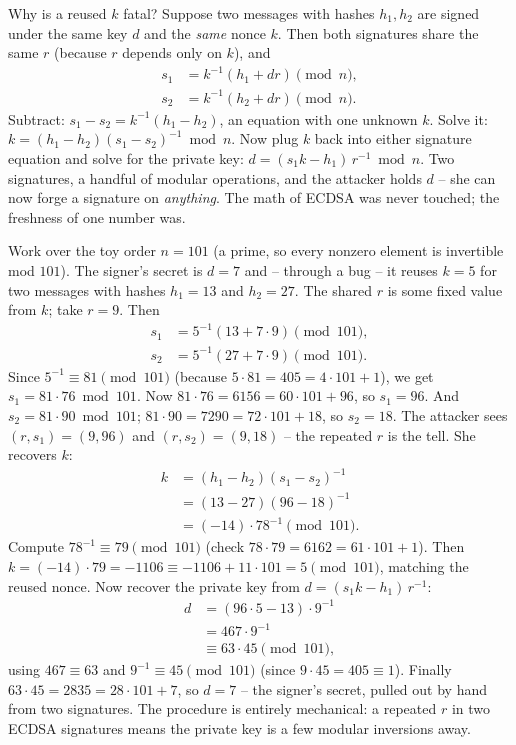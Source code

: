 \begin{whybox}
Why is a reused $k$ fatal? Suppose two messages with hashes $h_1, h_2$ are signed under the same key $d$ and the \emph{same} nonce $k$. Then both signatures share the same $r$ (because $r$ depends only on $k$), and
\begin{align*}
s_1 &= k^{-1}(h_1 + d r) \pmod n, \\
s_2 &= k^{-1}(h_2 + d r) \pmod n.
\end{align*}
Subtract: $s_1 - s_2 = k^{-1}(h_1 - h_2)$, an equation with one unknown $k$. Solve it: $k = (h_1 - h_2)(s_1 - s_2)^{-1} \bmod n$. Now plug $k$ back into either signature equation and solve for the private key: $d = (s_1 k - h_1)\, r^{-1} \bmod n$. Two signatures, a handful of modular operations, and the attacker holds $d$ -- she can now forge a signature on \emph{anything}. The math of ECDSA was never touched; the freshness of one number was.
\end{whybox}

\begin{example}
\label{ch38:ex-ecdsa}
Work over the toy order $n = 101$ (a prime, so every nonzero element is invertible mod $101$). The signer's secret is $d = 7$ and -- through a bug -- it reuses $k = 5$ for two messages with hashes $h_1 = 13$ and $h_2 = 27$. The shared $r$ is some fixed value from $k$; take $r = 9$. Then
\begin{align*}
s_1 &= 5^{-1}(13 + 7\cdot 9) \pmod{101}, \\
s_2 &= 5^{-1}(27 + 7\cdot 9) \pmod{101}.
\end{align*}
Since $5^{-1} \equiv 81 \pmod{101}$ (because $5\cdot 81 = 405 = 4\cdot101+1$), we get $s_1 = 81\cdot 76 \bmod 101$. Now $81\cdot76 = 6156 = 60\cdot101 + 96$, so $s_1 = 96$. And $s_2 = 81\cdot 90 \bmod 101$; $81\cdot90 = 7290 = 72\cdot101 + 18$, so $s_2 = 18$. The attacker sees $(r,s_1)=(9,96)$ and $(r,s_2)=(9,18)$ -- the repeated $r$ is the tell. She recovers $k$:
\begin{align*}
k &= (h_1 - h_2)(s_1 - s_2)^{-1} \\
  &= (13-27)(96-18)^{-1} \\
  &= (-14)\cdot 78^{-1} \pmod{101}.
\end{align*}
Compute $78^{-1}\equiv 79 \pmod{101}$ (check $78\cdot79 = 6162 = 61\cdot101 + 1$). Then $k = (-14)\cdot 79 = -1106 \equiv -1106 + 11\cdot101 = 5 \pmod{101}$, matching the reused nonce. Now recover the private key from $d = (s_1 k - h_1)\, r^{-1}$:
\begin{align*}
d &= (96\cdot 5 - 13)\cdot 9^{-1} \\
  &= 467\cdot 9^{-1} \\
  &\equiv 63 \cdot 45 \pmod{101},
\end{align*}
using $467 \equiv 63$ and $9^{-1}\equiv 45 \pmod{101}$ (since $9\cdot45 = 405 \equiv 1$). Finally $63\cdot 45 = 2835 = 28\cdot101 + 7$, so $d = 7$ -- the signer's secret, pulled out by hand from two signatures. The procedure is entirely mechanical: a repeated $r$ in two ECDSA signatures means the private key is a few modular inversions away.
\end{example}

